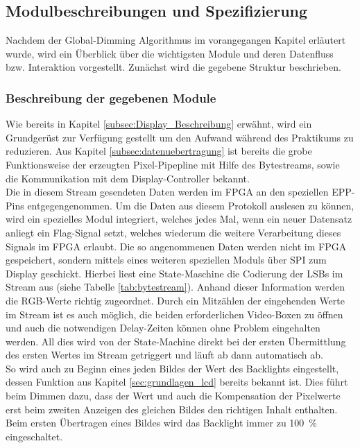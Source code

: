 \subsection{Modulbeschreibungen und Spezifizierung}
\label{subsec:modulbeschreibung_und_spec}
Nachdem der Global-Dimming Algorithmus im vorangegangen Kapitel erläutert wurde, wird ein Überblick über die wichtigsten Module und deren Datenfluss bzw. Interaktion vorgestellt. Zunächst wird die gegebene Struktur beschrieben.


\subsubsection{Beschreibung der gegebenen Module}
\label{subsubsec:Beschreibung_vorhandenes_Verilog_Modul}
Wie bereits in Kapitel \ref{subsec:Display_Beschreibung} erwähnt, wird ein Grundgerüst zur Verfügung gestellt um den Aufwand während des Praktikums zu reduzieren. Aus Kapitel \ref{subsec:datenuebertragung} ist bereits die grobe Funktionsweise der erzeugten Pixel-Pipepline mit Hilfe des Bytestreams, sowie die Kommunikation mit dem Display-Controller bekannt.\\
Die in diesem Stream gesendeten Daten werden im FPGA an den speziellen EPP-Pins entgegengenommen. Um die Daten aus diesem Protokoll auslesen zu können, wird ein spezielles Modul integriert, welches jedes Mal, wenn ein neuer Datensatz anliegt ein Flag-Signal setzt, welches wiederum die weitere Verarbeitung dieses Signals im FPGA erlaubt. Die so angenommenen Daten werden nicht im FPGA gespeichert, sondern mittels eines weiteren speziellen Moduls über SPI zum Display geschickt. Hierbei liest eine State-Maschine die Codierung der LSBs im Stream aus (siehe Tabelle \ref{tab:bytestream}). Anhand dieser Information werden die RGB-Werte richtig zugeordnet. Durch ein Mitzählen der eingehenden Werte im Stream ist es auch möglich, die beiden erforderlichen Video-Boxen zu öffnen und auch die notwendigen Delay-Zeiten können ohne Problem eingehalten werden. All dies wird von der State-Machine direkt bei der ersten Übermittlung des ersten Wertes im Stream getriggert und läuft ab dann automatisch ab. \\
So wird auch zu Beginn eines jeden Bildes der Wert des Backlights eingestellt, dessen Funktion aus Kapitel \ref{sec:grundlagen_lcd} bereits bekannt ist. Dies führt beim Dimmen dazu, dass der Wert und auch die Kompensation der Pixelwerte erst beim zweiten Anzeigen des gleichen Bildes den richtigen Inhalt enthalten. Beim ersten Übertragen eines Bildes wird das Backlight immer zu 100\ \% eingeschaltet.

